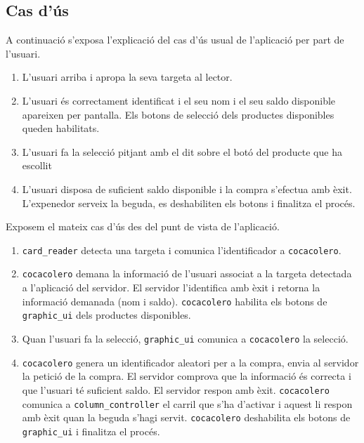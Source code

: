 \subsection{Cas d'ús}
A continuació s'exposa l'explicació del cas d'ús usual de l'aplicació per part de l'usuari.
\begin{enumerate}
\item L'usuari arriba i apropa la seva targeta al lector.
\item L'usuari és correctament identificat i el seu nom i el seu saldo disponible apareixen per pantalla. Els botons de selecció dels productes disponibles queden habilitats.
\item L'usuari fa la selecció pitjant amb el dit sobre el botó del producte que ha escollit
\item L'usuari disposa de suficient saldo disponible i la compra s'efectua amb èxit. L'expenedor serveix la beguda, es deshabiliten els botons i finalitza el procés.
\end{enumerate}

\newpage
Exposem el mateix cas d'ús des del punt de vista de l'aplicació.
\begin{enumerate}
\item \texttt{card\_reader} detecta una targeta i comunica l'identificador a \texttt{cocacolero}.
\item \texttt{cocacolero} demana la informació de l'usuari associat a la targeta detectada a l'aplicació del servidor. El servidor l'identifica amb èxit i retorna la informació demanada (nom i saldo). \texttt{cocacolero} habilita els botons de \texttt{graphic\_ui} dels productes disponibles.
\item Quan l'usuari fa la selecció, \texttt{graphic\_ui} comunica a \texttt{cocacolero} la selecció.
\item \texttt{cocacolero} genera un identificador aleatori per a la compra, envia al servidor la petició de la compra. El servidor comprova que la informació és correcta i que l'usuari té suficient saldo. El servidor respon amb èxit. \texttt{cocacolero} comunica a \texttt{column\_controller} el carril que s'ha d'activar i aquest li respon amb èxit quan la beguda s'hagi servit. \texttt{cocacolero} deshabilita els botons de \texttt{graphic\_ui} i finalitza el procés.
\end{enumerate}

